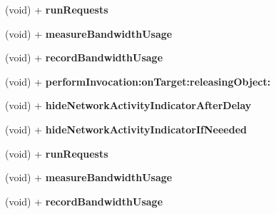 \begin{DoxyCompactItemize}
\item 
\hypertarget{interface_a_s_i_h_t_t_p_request_07_08_a3948708d5250dec349a05e2d5d943ba0}{
(void) + {\bfseries run\-Requests}}
\label{interface_a_s_i_h_t_t_p_request_07_08_a3948708d5250dec349a05e2d5d943ba0}

\item 
\hypertarget{interface_a_s_i_h_t_t_p_request_07_08_ae002cae4049589d09b529b25d0a4df61}{
(void) + {\bfseries measure\-Bandwidth\-Usage}}
\label{interface_a_s_i_h_t_t_p_request_07_08_ae002cae4049589d09b529b25d0a4df61}

\item 
\hypertarget{interface_a_s_i_h_t_t_p_request_07_08_a9bfa27b53cfee20fcb4353aaa1fe015b}{
(void) + {\bfseries record\-Bandwidth\-Usage}}
\label{interface_a_s_i_h_t_t_p_request_07_08_a9bfa27b53cfee20fcb4353aaa1fe015b}

\item 
\hypertarget{interface_a_s_i_h_t_t_p_request_07_08_ac5f0757b7a71e70cee7a93dd7e9ee9f8}{
(void) + {\bfseries perform\-Invocation\-:on\-Target\-:releasing\-Object\-:}}
\label{interface_a_s_i_h_t_t_p_request_07_08_ac5f0757b7a71e70cee7a93dd7e9ee9f8}

\item 
\hypertarget{interface_a_s_i_h_t_t_p_request_07_08_a8b784d38e3706dbbce3d956bfe8c4d11}{
(void) + {\bfseries hide\-Network\-Activity\-Indicator\-After\-Delay}}
\label{interface_a_s_i_h_t_t_p_request_07_08_a8b784d38e3706dbbce3d956bfe8c4d11}

\item 
\hypertarget{interface_a_s_i_h_t_t_p_request_07_08_a60cd7d715f73401f380a650c2257d32b}{
(void) + {\bfseries hide\-Network\-Activity\-Indicator\-If\-Neeeded}}
\label{interface_a_s_i_h_t_t_p_request_07_08_a60cd7d715f73401f380a650c2257d32b}

\item 
\hypertarget{interface_a_s_i_h_t_t_p_request_07_08_a3948708d5250dec349a05e2d5d943ba0}{
(void) + {\bfseries run\-Requests}}
\label{interface_a_s_i_h_t_t_p_request_07_08_a3948708d5250dec349a05e2d5d943ba0}

\item 
\hypertarget{interface_a_s_i_h_t_t_p_request_07_08_ae002cae4049589d09b529b25d0a4df61}{
(void) + {\bfseries measure\-Bandwidth\-Usage}}
\label{interface_a_s_i_h_t_t_p_request_07_08_ae002cae4049589d09b529b25d0a4df61}

\item 
\hypertarget{interface_a_s_i_h_t_t_p_request_07_08_a9bfa27b53cfee20fcb4353aaa1fe015b}{
(void) + {\bfseries record\-Bandwidth\-Usage}}
\label{interface_a_s_i_h_t_t_p_request_07_08_a9bfa27b53cfee20fcb4353aaa1fe015b}


\end{DoxyCompactItemize}

